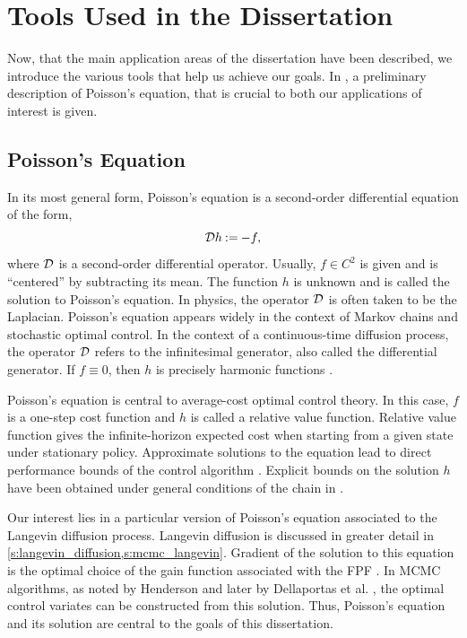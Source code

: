 \section{Tools Used in the Dissertation}
\label{s:tools}
Now, that the main application areas of the dissertation have been described, we introduce the various tools that help us achieve our goals. In , a preliminary description of Poisson's equation, that is crucial to both our applications of interest is given.
\subsection{Poisson's Equation} 
\label{s:poissons}
In its most general form, Poisson's equation is a second-order differential equation of the form,
\begin{equation*}
{\cal D} h \mathbin{:=} - f,
\end{equation*}
where ${\cal D}$ is a second-order differential operator. Usually, $f \in C^2$ is given and is ``centered'' by subtracting its mean. The function $h$ is unknown and is called the solution to Poisson's equation. In physics, the operator ${\cal D}$ is often taken to be the Laplacian. Poisson's equation appears widely in the context of Markov chains and stochastic optimal control. In the context of a continuous-time diffusion process, the operator ${\cal D}$ refers to the infinitesimal generator, also called the differential generator. If $f \equiv 0$, then $h$ is precisely harmonic functions \cite{glymey96a}.

Poisson's equation is central to average-cost optimal control theory. In this case, $f$ is a one-step cost function and $h$ is called a relative value function.  Relative value function gives the infinite-horizon expected cost when starting from a given state under  stationary policy. Approximate solutions to the equation lead to direct performance bounds of the control algorithm \cite{ctcn}. Explicit bounds on the solution $h$ have been obtained under general conditions of the chain in \cite{}. 

Our interest lies in a particular version of Poisson's equation associated to the Langevin diffusion process. Langevin diffusion is discussed in greater detail in \cref{s:langevin_diffusion,s:mcmc_langevin}. Gradient of the solution to this equation is the optimal choice of the gain function associated with the FPF \cite{yanmehmey13}. In MCMC algorithms, as noted by Henderson \cite{henthesis97} and later by Dellaportas et al. \cite{delkon12}, the optimal control variates can be constructed from this solution. Thus, Poisson's equation and its solution are central to the goals of this dissertation. 
 
